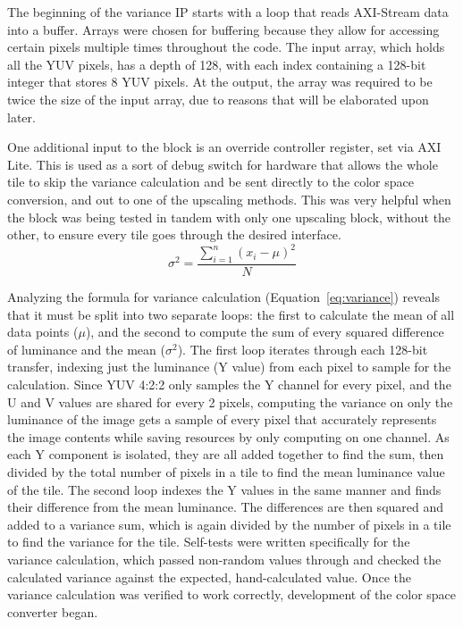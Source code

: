 \documentclass{article}
\newcounter{subsubsubsection}[subsubsection]
\begin{document}
                
                    \noindent The beginning of the variance IP starts with a loop that reads AXI-Stream data into a buffer. Arrays were chosen for buffering because they allow for accessing certain pixels multiple times throughout the code. The input array, which holds all the YUV pixels, has a depth of 128, with each index containing a 128-bit integer that stores 8 YUV pixels. At the output, the array was required to be twice the size of the input array, due to reasons that will be elaborated upon later. 
                    \par One additional input to the block is an override controller register, set via AXI Lite. This is used as a sort of debug switch for hardware that allows the whole tile to skip the variance calculation and be sent directly to the color space conversion, and out to one of the upscaling methods. This was very helpful when the block was being tested in tandem with only one upscaling block, without the other, to ensure every tile goes through the desired interface. 
                    \begin{equation}
                    \sigma^2 = \frac{ \sum_{i=1}^{n} (x_i - \mu)^2 }{N}
                    \label{eq:variance}
                    \end{equation}
                    \par Analyzing the formula for variance calculation (Equation~\ref{eq:variance}) reveals that it must be split into two separate loops: the first to calculate the mean of all data points (\(\mu\)), and the second to compute the sum of every squared difference of luminance and the mean (\(\sigma^2\)). The first loop iterates through each 128-bit transfer, indexing just the luminance (Y value) from each pixel to sample for the calculation. Since YUV 4:2:2 only samples the Y channel for every pixel, and the U and V values are shared for every 2 pixels, computing the variance on only the luminance of the image gets a sample of every pixel that accurately represents the image contents while saving resources by only computing on one channel. As each Y component is isolated, they are all added together to find the sum, then divided by the total number of pixels in a tile to find the mean luminance value of the tile. The second loop indexes the Y values in the same manner and finds their difference from the mean luminance. The differences are then squared and added to a variance sum, which is again divided by the number of pixels in a tile to find the variance for the tile. Self-tests were written specifically for the variance calculation, which passed non-random values through and checked the calculated variance against the expected, hand-calculated value. Once the variance calculation was verified to work correctly, development of the color space converter began.
\end{document}
